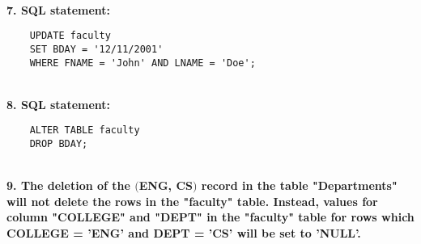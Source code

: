 \documentclass[letterpaper,11pt]{article}
\newcommand{\Paragraph}[1]{~\vspace*{-0.7\baselineskip}\\{\bf #1}}
\begin{document}
\Paragraph{7. SQL statement: }
\begin{verbatim}
	UPDATE faculty
	SET BDAY = '12/11/2001'
	WHERE FNAME = 'John' AND LNAME = 'Doe';
\end{verbatim}

\Paragraph{8. SQL statement: }
\begin{verbatim}
	ALTER TABLE faculty
	DROP BDAY; 
\end{verbatim}

\Paragraph{9. 
	The deletion of the \((\)ENG, CS\()\) record in the table "Departments" will not delete the rows 
	in the "faculty" table. Instead, values for column "COLLEGE" and "DEPT" in the "faculty" table for 
	rows which COLLEGE = 'ENG' and DEPT = 'CS' will be set to 'NULL'. \\
}	
\end{document}
